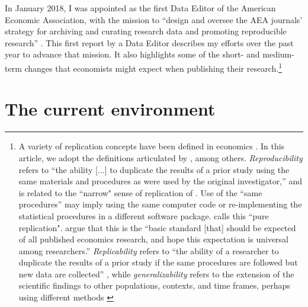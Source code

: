 \documentclass[AEJ]{AEA}
\begin{document}
In January 2018, I was appointed as the first Data Editor of the American Economic Association, with the mission to ``design  and  oversee  the  AEA  journals’  strategy for archiving and curating research data and promoting  reproducible  research'' \citep{10.1257/pandp.108.745}. This first report by a Data Editor describes my efforts over the past year to advance  that mission. It also highlights some of the short- and medium-term changes that economists might expect when publishing their research.\footnote{A variety of replication concepts have been defined in economics \citep{Hamermesh2007,ClemensJ.Econ.Surv.2017}. In this article, we adopt the definitions articulated by \citet{Bollen2015-vb}, among others. \textit{Reproducibility}  refers to ``the ability [$\dots$] to duplicate the results of a prior study using the same materials and procedures as were used by the original investigator,'' and is related to the ``narrow" sense of replication of \cite{Pesaran2003}. Use of the ``same procedures'' may imply using the same computer code or re-implementing the statistical procedures in a different software package. \cite{Hamermesh2007} calls this ``pure replication". \citet[p. 942]{ChristensenTransparencyReproducibilityCredibility2018} argue that this is the ``basic standard [that] should be expected of all published economics research, and hope this expectation is universal among researchers.'' \textit{Replicability} refers to ``the ability of a researcher to duplicate the results of a prior study if the same procedures are followed but new data are collected'' \citep[ ``wider'' sense of replication]{Pesaran2003}, while \textit{generalizability} refers to the extension of the scientific findings to other populations, contexts, and time frames, perhaps using different methods \citep[ ``scientific replication'']{Hamermesh2017}}


\section{The current environment}
\end{document}
